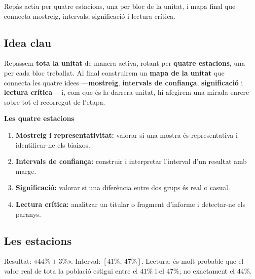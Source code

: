 %
{Repàs actiu per quatre estacions, una per bloc de la unitat, i mapa final que connecta mostreig, intervals, significació i lectura crítica.}

\subsection{Idea clau}

Repassem \textbf{tota la unitat} de manera activa, rotant per \textbf{quatre estacions},
una per cada bloc treballat. Al final construirem un \textbf{mapa de la unitat} que connecta
les quatre idees —\textbf{mostreig}, \textbf{intervals de confiança}, \textbf{significació}
i \textbf{lectura crítica}— i, com que és la darrera unitat, hi afegirem una mirada enrere
sobre tot el recorregut de l'etapa.

\begin{idea}
\textbf{Les quatre estacions}
\begin{enumerate}[leftmargin=1.6em, itemsep=2pt]
  \item \textbf{Mostreig i representativitat:} valorar si una mostra és representativa i
        identificar-ne els biaixos.
  \item \textbf{Intervals de confiança:} construir i interpretar l'interval d'un resultat
        amb marge.
  \item \textbf{Significació:} valorar si una diferència entre dos grups és real o casual.
  \item \textbf{Lectura crítica:} analitzar un titular o fragment d'informe i detectar-ne
        els paranys.
\end{enumerate}
\end{idea}

\subsection{Les estacions}

\begin{exemple}
Resultat: «$44\%\pm 3\%$». Interval: $[41\%,\,47\%]$. Lectura: és molt probable que el valor
real de tota la població estigui entre el $41\%$ i el $47\%$; no exactament el $44\%$.
\end{exemple}

